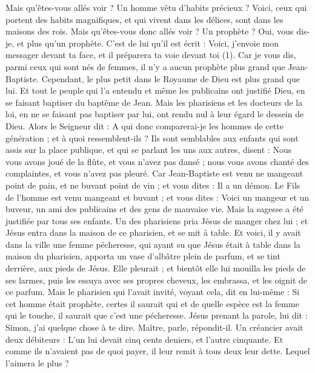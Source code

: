\begin{multicols}{2}
Mais qu'êtes-vous allés voir ? Un homme vêtu d’habits précieux ? Voici, ceux qui portent des habits magnifiques, et qui vivent dans les délices, sont dans les maisons des rois.
Mais qu'êtes-vous donc allés voir ? Un prophète ? Oui, vous dis-je, et plus qu'un prophète.
C'est de lui qu'il est écrit : Voici, j'envoie mon messager devant ta face, et il préparera ta voie devant toi (1).
Car je vous dis, parmi ceux qui sont nés de femmes, il n'y a aucun prophète plus grand que Jean-Baptiste. Cependant, le plus petit dans le Royaume de Dieu est plus grand que lui.
Et tout le peuple qui l’a entendu et même les publicains ont justifié Dieu, en se faisant baptiser du baptême de Jean.
Mais les pharisiens et les docteurs de la loi, en ne se faisant pas baptiser par lui, ont rendu nul à leur égard le dessein de Dieu.
Alors le Seigneur dit : A qui donc comparerai-je les hommes de cette génération ; et à quoi ressemblent-ils ?
Ils sont semblables aux enfants qui sont assis sur la place publique, et qui se parlant les uns aux autres, disent : Nous vous avons joué de la flûte, et vous n'avez pas dansé ; nous vous avons chanté des complaintes, et vous n'avez pas pleuré.
Car Jean-Baptiste est venu ne mangeant point de pain, et ne buvant point de vin ; et vous dites : Il a un démon.
Le Fils de l'homme est venu mangeant et buvant ; et vous dites : Voici un mangeur et un buveur, un ami des publicains et des gens de mauvaise vie.
Mais la sagesse a été justifiée par tous ses enfants.
Un des pharisiens pria Jésus de manger chez lui ; et Jésus entra dans la maison de ce pharisien, et se mit à table.
Et voici, il y avait dans la ville une femme pécheresse, qui ayant su que Jésus était à table dans la maison du pharisien, apporta un vase d'albâtre plein de parfum,
et se tint derrière, aux pieds de Jésus. Elle pleurait ; et bientôt elle lui mouilla les pieds de ses larmes, puis les essuya avec ses propres cheveux, les embrassa, et les oignit de ce parfum.
Mais le pharisien qui l'avait invité, voyant cela, dit en lui-même : Si cet homme était prophète, certes il saurait qui et de quelle espèce est la femme qui le touche, il saurait que c’est une pécheresse.
Jésus prenant la parole, lui dit : Simon, j'ai quelque chose à te dire. Maître, parle, répondit-il.
Un créancier avait deux débiteurs : L’un lui devait cinq cents deniers, et l'autre cinquante.
Et comme ils n'avaient pas de quoi payer, il leur remit à tous deux leur dette. Lequel l'aimera le plus ?

\end{multicols}
